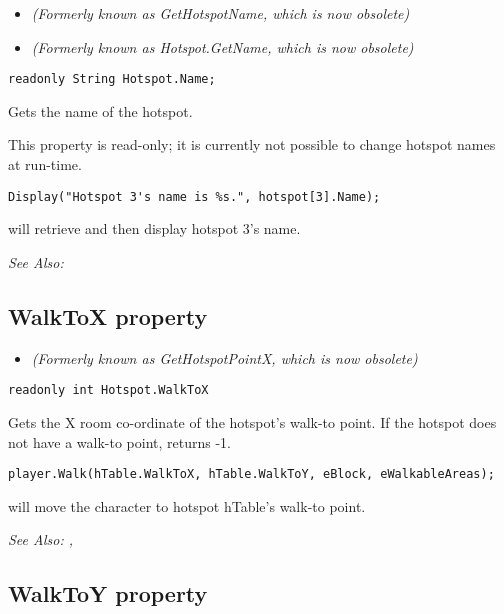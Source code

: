 \begin{itemize}
\item \it{(Formerly known as GetHotspotName, which is now obsolete)}
\item \it{(Formerly known as Hotspot.GetName, which is now obsolete)}
\end{itemize}

\begin{verbatim}
readonly String Hotspot.Name;
\end{verbatim}
Gets the name of the hotspot.

This property is read-only; it is currently not possible to change hotspot names at run-time.

\begin{verbatim}
Display("Hotspot 3's name is %s.", hotspot[3].Name);
\end{verbatim}
will retrieve and then display hotspot 3's name.

\it{See Also:} 


\subsection{WalkToX property}\label{Hotspot.WalkToX}%

\begin{itemize}
\item \it{(Formerly known as GetHotspotPointX, which is now obsolete)}
\end{itemize}

\begin{verbatim}
readonly int Hotspot.WalkToX
\end{verbatim}
Gets the X room co-ordinate of the hotspot's walk-to point. If the hotspot
does not have a walk-to point, returns -1.

\begin{verbatim}
player.Walk(hTable.WalkToX, hTable.WalkToY, eBlock, eWalkableAreas);
\end{verbatim}
will move the character to hotspot hTable's walk-to point.

\it{See Also:} ,


\subsection{WalkToY property}\label{Hotspot.WalkToY}%

